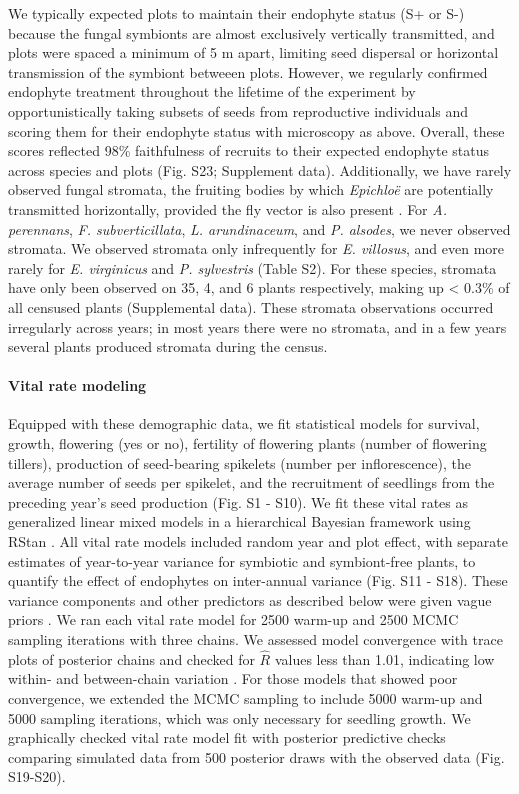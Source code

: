 \documentclass[12pt]{article}
\begin{document}
We typically expected plots to maintain their endophyte status (S+ or S-) because the fungal symbionts are almost exclusively vertically transmitted, and plots were spaced a minimum of 5 m apart, limiting seed dispersal or horizontal transmission of the symbiont betweeen plots. 
However, we regularly confirmed endophyte treatment throughout the lifetime of the experiment by opportunistically taking subsets of seeds from reproductive individuals and scoring them for their endophyte status with microscopy as above.
Overall, these scores reflected 98\% faithfulness of recruits to their expected endophyte status across species and plots (Fig. S23; Supplement data). 
Additionally, we have rarely observed fungal stromata, the fruiting bodies by which \emph{Epichlo\"e} are potentially transmitted horizontally, provided the fly vector is also present \cite{bultman1995mutualistic}. 
For \emph{A. perennans}, \emph{F. subverticillata}, \emph{L. arundinaceum}, and \emph{P. alsodes}, we never observed stromata. 
We observed stromata only infrequently for \emph{E. villosus}, and even more rarely for \emph{E. virginicus} and \emph{P. sylvestris} (Table S2). 
For these species, stromata have only been observed on 35, 4, and 6 plants respectively, making up < 0.3\% of all censused plants (Supplemental data).
These stromata observations occurred irregularly across years; in most years there were no stromata, and in a few years several plants produced stromata during the census. 

\paragraph*{Vital rate modeling}
Equipped with these demographic data, we fit statistical models for survival, growth, flowering (yes or no), fertility of flowering plants (number of flowering tillers),  production of seed-bearing spikelets (number per inflorescence), the average number of seeds per spikelet, and the recruitment of seedlings from the preceding year's seed production (Fig. S1 - S10).  
We fit these vital rates as generalized linear mixed models in a hierarchical Bayesian framework  using RStan \cite{rstan2022}. 
All vital rate models included random year and plot effect, with separate estimates of year-to-year variance for symbiotic and symbiont-free plants, to quantify the effect of endophytes on inter-annual variance (Fig. S11 - S18).
These variance components and other predictors as described below were given vague priors \cite{gabry2019visualization}.
We ran each vital rate model for 2500 warm-up and 2500 MCMC sampling iterations with three chains. 
We assessed model convergence with trace plots of posterior chains and checked for $\hat{R}$ values less than 1.01, indicating low within- and between-chain variation \cite{brooks1998general,gelman2006data}. 
For those models that showed poor convergence, we extended the MCMC sampling to include 5000 warm-up and 5000 sampling iterations, which was only necessary for seedling growth. 
We graphically checked vital rate model fit with posterior predictive checks comparing simulated data from 500 posterior draws with the observed data (Fig. S19-S20).
\end{document}
